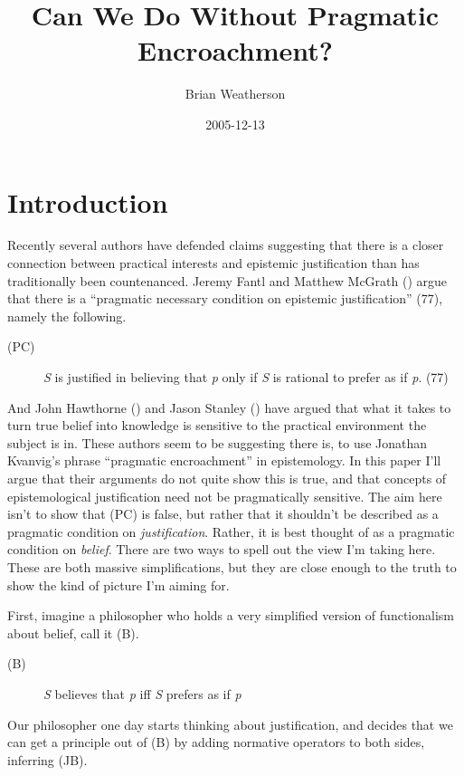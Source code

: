 \documentclass[
  11pt,
  letterpaper,
  DIV=11,
  numbers=noendperiod,
  oneside]{scrartcl}
\title{Can We Do Without Pragmatic Encroachment?}
\author{Brian Weatherson}
\date{2005-12-13}
\begin{document}
\maketitle
\section{Introduction}\label{introduction}

Recently several authors have defended claims suggesting that there is a
closer connection between practical interests and epistemic
justification than has traditionally been countenanced. Jeremy Fantl and
Matthew McGrath () argue that there is a
``pragmatic necessary condition on epistemic justification'' (77),
namely the following.

\begin{description}
\item[(PC)]
\emph{S} is justified in believing that \emph{p} only if \emph{S} is
rational to prefer as if \emph{p}. (77)
\end{description}

And John Hawthorne () and Jason
Stanley () have argued that what
it takes to turn true belief into knowledge is sensitive to the
practical environment the subject is in. These authors seem to be
suggesting there is, to use Jonathan Kvanvig's phrase ``pragmatic
encroachment'' in epistemology. In this paper I'll argue that their
arguments do not quite show this is true, and that concepts of
epistemological justification need not be pragmatically sensitive. The
aim here isn't to show that (PC) is false, but rather that it shouldn't
be described as a pragmatic condition on \emph{justification}. Rather,
it is best thought of as a pragmatic condition on \emph{belief}. There
are two ways to spell out the view I'm taking here. These are both
massive simplifications, but they are close enough to the truth to show
the kind of picture I'm aiming for.

First, imagine a philosopher who holds a very simplified version of
functionalism about belief, call it (B).

\begin{description}
\item[(B)]
\emph{S} believes that \emph{p} iff \emph{S} prefers as if \emph{p}
\end{description}

Our philosopher one day starts thinking about justification, and decides
that we can get a principle out of (B) by adding normative operators to
both sides, inferring (JB).
\end{document}
